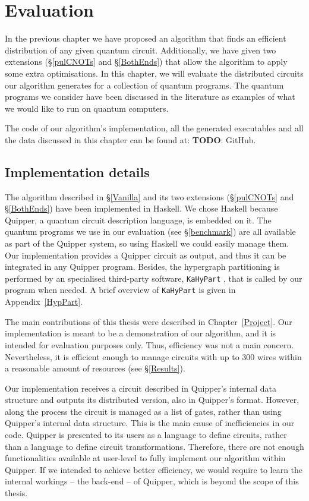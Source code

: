 \chapter{Evaluation}

In the previous chapter we have proposed an algorithm that finds an efficient distribution of any given quantum circuit. Additionally, we have given two extensions (\S\ref{pulCNOTs} and \S\ref{BothEnds}) that allow the algorithm to apply some extra optimisations. In this chapter, we will evaluate the distributed circuits our algorithm generates for a collection of quantum programs. The quantum programs we consider have been discussed in the literature as examples of what we would like to run on quantum computers.

The code of our algorithm's implementation, all the generated executables and all the data discussed in this chapter can be found at: \textbf{TODO}: GitHub. 


\section{Implementation details}
\label{implementation}

The algorithm described in \S\ref{Vanilla} and its two extensions (\S\ref{pulCNOTs} and \S\ref{BothEnds}) have been implemented in Haskell. We chose Haskell because Quipper, a quantum circuit description language, is embedded on it. The quantum programs we use in our evaluation (see \S\ref{benchmark}) are all available as part of the Quipper system, so using Haskell we could easily manage them. Our implementation provides a Quipper circuit as output, and thus it can be integrated in any Quipper program. Besides, the hypergraph partitioning is performed by an specialised third-party software, \texttt{KaHyPart} \citep{KaHyPart}, that is called by our program when needed. A brief overview of \texttt{KaHyPart} is given in Appendix~\ref{HypPart}. 

The main contributions of this thesis were described in Chapter~\ref{Project}. Our implementation is meant to be a demonstration of our algorithm, and it is intended for evaluation purposes only. Thus, efficiency was not a main concern. Nevertheless, it is efficient enough to manage circuits with up to \(300\) wires within a reasonable amount of resources (see \S\ref{Results}).

Our implementation receives a circuit described in Quipper's internal data structure and outputs its distributed version, also in Quipper's format. However, along the process the circuit is managed as a list of gates, rather than using Quipper's internal data structure. This is the main cause of inefficiencies in our code. Quipper is presented to its users as a language to define circuits, rather than a language to define circuit transformations. Therefore, there are not enough functionalities available at user-level to fully implement our algorithm within Quipper. If we intended to achieve better efficiency, we would require to learn the internal workings -- the back-end -- of Quipper, which is beyond the scope of this thesis.

